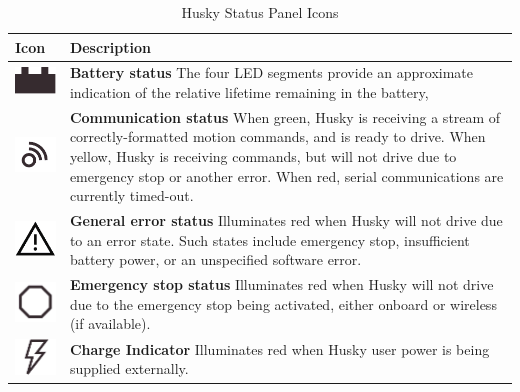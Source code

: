 \documentclass[]{clearpath-latex/clearpath-manual}
\begin{document}
\begin{table}[h]
  \renewcommand{\arraystretch}{1.6}
  \centering
    \begin{tabular}{ >{\centering\arraybackslash}m{.1\linewidth} >{\raggedright\arraybackslash}m{.7\linewidth} }
      \hline
    \rowcolor{lightgrey} Icon & Description
      \\ \hline
    \includegraphics[width=0.7 cm]{battery-mini.png} &
      \textbf{Battery status} The four LED segments provide an approximate indication of the relative lifetime remaining in the battery,
      \\[4pt] \hline
    \includegraphics[width=0.7 cm]{comm-mini.png} &
      \textbf{Communication status} When green, Husky is receiving a stream of correctly-formatted motion commands, and is ready to drive. When yellow, Husky is receiving commands, but will not drive due to emergency stop or another error. When red, serial communications are currently timed-out.
      \\[4pt] \hline
    \includegraphics[width=0.7 cm]{err-mini.png} &
      \textbf{General error status} Illuminates red when Husky will not drive due to an error state. Such states include emergency stop, insufficient battery power, or an unspecified software error.
      \\[4pt] \hline
    \includegraphics[width=0.7 cm]{estop-mini.png} &
      \textbf{Emergency stop status} Illuminates red when Husky will not drive due to the emergency stop being activated, either onboard or wireless (if available).
      \\[4pt] \hline
    \includegraphics[width=0.7 cm]{charge-mini.png} &
      \textbf{Charge Indicator} Illuminates red when Husky user power is being supplied externally.
      \\[4pt] \hline
    \end{tabular}
  \caption{Husky Status Panel Icons}
  \label{status_panel}
\end{table}
\newpage
\end{document}
